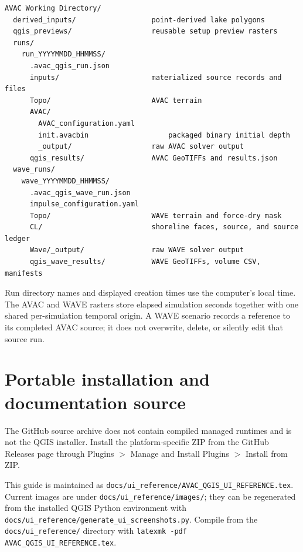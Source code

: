 \documentclass[11pt,a4paper]{article}
\newcommand{\pathcode}[1]{\texttt{#1}}
\begin{document}
\begin{verbatim}
AVAC Working Directory/
  derived_inputs/                  point-derived lake polygons
  qgis_previews/                   reusable setup preview rasters
  runs/
    run_YYYYMMDD_HHMMSS/
      .avac_qgis_run.json
      inputs/                      materialized source records and files
      Topo/                        AVAC terrain
      AVAC/
        AVAC_configuration.yaml
        init.avacbin                   packaged binary initial depth
        _output/                   raw AVAC solver output
      qgis_results/                AVAC GeoTIFFs and results.json
  wave_runs/
    wave_YYYYMMDD_HHMMSS/
      .avac_qgis_wave_run.json
      impulse_configuration.yaml
      Topo/                        WAVE terrain and force-dry mask
      CL/                          shoreline faces, source, and source ledger
      Wave/_output/                raw WAVE solver output
      qgis_wave_results/           WAVE GeoTIFFs, volume CSV, manifests
\end{verbatim}

Run directory names and displayed creation times use the computer's local
time. The AVAC and WAVE rasters store elapsed simulation seconds together with
one shared per-simulation temporal origin. A WAVE scenario records a reference
to its completed AVAC source; it does not overwrite, delete, or silently edit
that source run.

\section{Portable installation and documentation source}

The GitHub source archive does not contain compiled managed runtimes and is not
the QGIS installer. Install the platform-specific ZIP from the GitHub Releases
page through Plugins $>$ Manage and Install Plugins $>$ Install from ZIP.

This guide is maintained as
\pathcode{docs/ui\_reference/AVAC\_QGIS\_UI\_REFERENCE.tex}.
Current images are under \pathcode{docs/ui\_reference/images/}; they can be
regenerated from the installed QGIS Python environment with
\pathcode{docs/ui\_reference/generate\_ui\_screenshots.py}. Compile from the
\pathcode{docs/ui\_reference/} directory with \pathcode{latexmk -pdf
AVAC\_QGIS\_UI\_REFERENCE.tex}.
\end{document}
